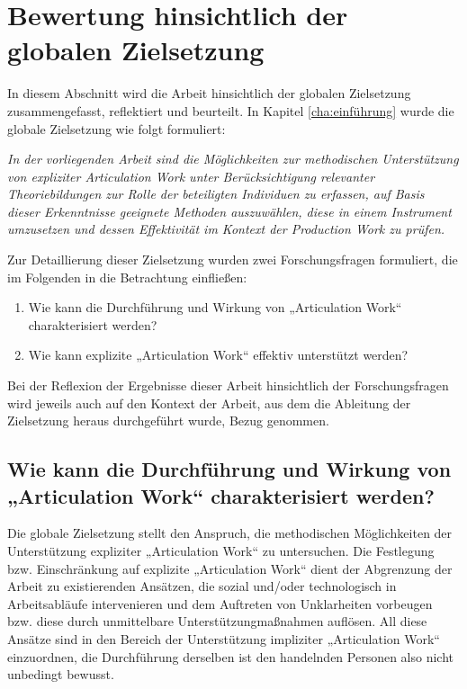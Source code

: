 \section{Bewertung hinsichtlich der globalen Zielsetzung}
\label{sec:bewertung_hinsichtlich_der_globalen_zielsetzung}

In diesem Abschnitt wird die Arbeit hinsichtlich der globalen Zielsetzung zusammengefasst, reflektiert und beurteilt. In Kapitel \ref{cha:einführung} wurde die globale Zielsetzung wie folgt formuliert:

\begin{framed}	
	\emph{In der vorliegenden Arbeit sind die Möglichkeiten zur methodischen Unterstützung von expliziter Articulation Work unter Berücksichtigung relevanter Theoriebildungen zur Rolle der beteiligten Individuen zu erfassen, auf Basis dieser Erkenntnisse geeignete Methoden auszuwählen, diese in einem Instrument umzusetzen und dessen Effektivität im Kontext der Production Work zu prüfen.}
\end{framed}

Zur Detaillierung dieser Zielsetzung wurden zwei Forschungsfragen formuliert, die im Folgenden in die Betrachtung einfließen:
\begin{enumerate}
	\item Wie kann die Durchführung und Wirkung von „Articulation Work“ charakterisiert werden?
	\item Wie kann explizite „Articulation Work“ effektiv unterstützt werden?
\end{enumerate}

Bei der Reflexion der Ergebnisse dieser Arbeit hinsichtlich der Forschungsfragen wird jeweils auch auf den Kontext der Arbeit, aus dem die Ableitung der Zielsetzung heraus durchgeführt wurde, Bezug genommen.

\subsection{Wie kann die Durchführung und Wirkung von „Articulation Work“ charakterisiert werden?}

Die globale Zielsetzung stellt den Anspruch, die methodischen Möglichkeiten der Unterstützung expliziter „Articulation Work“ zu untersuchen. Die Festlegung bzw. Einschränkung auf explizite „Articulation Work“ dient der Abgrenzung der Arbeit zu existierenden Ansätzen, die sozial und/oder technologisch in Arbeitsabläufe intervenieren und dem Auftreten von Unklarheiten vorbeugen bzw. diese durch unmittelbare Unterstützungmaßnahmen auflösen. All diese Ansätze sind in den Bereich der Unterstützung impliziter „Articulation Work“ einzuordnen, die Durchführung derselben ist den handelnden Personen also nicht unbedingt bewusst. 

